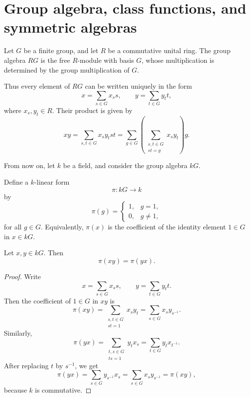 \section{Group algebra, class functions, and symmetric algebras}
\begin{definition}
    Let \(G\) be a finite group, and let \(R\) be a commutative unital ring.
    The group algebra \(RG\) is the free \(R\)-module with basis \(G\), whose
    multiplication is determined by the group multiplication of \(G\).

    Thus every element of \(RG\) can be written uniquely in the form
    \[
        x=\sum_{s\in G} x_s s,
        \qquad
        y=\sum_{t\in G} y_t t,
    \]
    where \(x_s,y_t\in R\). Their product is given by
    \[
        xy
        =
        \sum_{s,t\in G} x_s y_t st
        =
        \sum_{g\in G}
        \left(
        \sum_{\substack{s,t\in G\\ st=g}} x_s y_t
        \right) g.
    \]
\end{definition}

From now on, let \(k\) be a field, and consider the group algebra \(kG\).

\begin{definition}
    Define a \(k\)-linear form
    \[
        \pi:kG\longrightarrow k
    \]
    by
    \[
        \pi(g)=
        \begin{cases}
            1, & g=1,     \\
            0, & g\neq 1,
        \end{cases}
    \]
    for all \(g\in G\). Equivalently, \(\pi(x)\) is the coefficient of the identity
    element \(1\in G\) in \(x\in kG\).
\end{definition}

\begin{lemma}
    Let \(x,y\in kG\). Then
    \[
        \pi(xy)=\pi(yx).
    \]
\end{lemma}

\begin{proof}
    Write
    \[
        x=\sum_{s\in G}x_s s,
        \qquad
        y=\sum_{t\in G}y_t t.
    \]
    Then the coefficient of \(1\in G\) in \(xy\) is
    \[
        \pi(xy)
        =
        \sum_{\substack{s,t\in G\\ st=1}}x_s y_t
        =
        \sum_{s\in G}x_s y_{s^{-1}}.
    \]
    Similarly,
    \[
        \pi(yx)
        =
        \sum_{\substack{t,s\in G\\ ts=1}}y_t x_s
        =
        \sum_{t\in G}y_t x_{t^{-1}}.
    \]
    After replacing \(t\) by \(s^{-1}\), we get
    \[
        \pi(yx)
        =
        \sum_{s\in G}y_{s^{-1}}x_s
        =
        \sum_{s\in G}x_s y_{s^{-1}}
        =
        \pi(xy),
    \]
    because \(k\) is commutative.
\end{proof}

